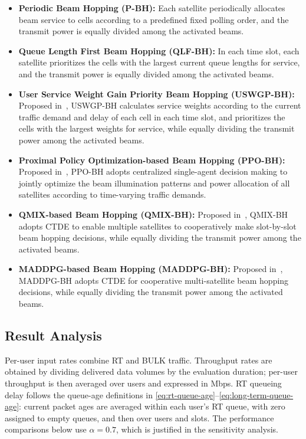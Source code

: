 \documentclass[journal]{IEEEtran}
\newcommand{\revbegin}[1]{\color{revisionblue}\ignorespaces}
\newcommand{\revend}[1]{\color{black}\ignorespaces}
\begin{document}
\begin{itemize}
    \item \textbf{Periodic Beam Hopping (P-BH):} Each satellite periodically allocates beam service to cells according to a predefined fixed polling order, and the transmit power is equally divided among the activated beams.
        \item \textbf{Queue Length First Beam Hopping (QLF-BH):} In each time slot, each satellite prioritizes the cells with the largest current queue lengths for service, and the transmit power is equally divided among the activated beams.
    \item \textbf{User Service Weight Gain Priority Beam Hopping (USWGP-BH):} Proposed in~\cite{ref14}, USWGP-BH calculates service weights according to the current traffic demand and delay of each cell in each time slot, and prioritizes the cells with the largest weights for service, while equally dividing the transmit power among the activated beams.
        \item \textbf{Proximal Policy Optimization-based Beam Hopping (PPO-BH):} Proposed in~\cite{ref20}, PPO-BH adopts centralized single-agent decision making to jointly optimize the beam illumination patterns and power allocation of all satellites according to time-varying traffic demands.
    \item \textbf{QMIX-based Beam Hopping (QMIX-BH):} Proposed in~\cite{ref21}, QMIX-BH adopts CTDE to enable multiple satellites to cooperatively make slot-by-slot beam hopping decisions, while equally dividing the transmit power among the activated beams.
    \item \textbf{MADDPG-based Beam Hopping (MADDPG-BH):} Proposed in~\cite{ref23}, MADDPG-BH adopts CTDE for cooperative multi-satellite beam hopping decisions, while equally dividing the transmit power among the activated beams.

\end{itemize}

\subsection{Result Analysis}
\label{subsec:result-analysis}
\revbegin{}Per-user input rates combine RT and BULK traffic. Throughput rates are obtained by dividing delivered data volumes by the evaluation duration; per-user throughput is then averaged over users and expressed in Mbps. RT queueing delay follows the queue-age definitions in \eqref{eq:rt-queue-age}--\eqref{eq:long-term-queue-age}: current packet ages are averaged within each user's RT queue, with zero assigned to empty queues, and then over users and slots. The performance comparisons below use $\alpha=0.7$, which is justified in the sensitivity analysis.\revend{}
\end{document}
